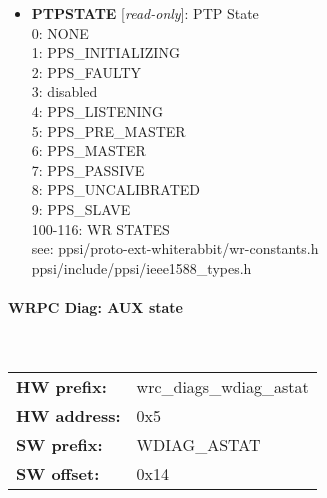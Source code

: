 \begin{itemize}
\item \begin{small}
{\bf 
PTPSTATE
} [\emph{read-only}]: PTP State
\\
0: NONE\\                     1: PPS\_INITIALIZING\\                     2: PPS\_FAULTY\\                     3: disabled\\                     4: PPS\_LISTENING\\                     5: PPS\_PRE\_MASTER\\                     6: PPS\_MASTER\\                     7: PPS\_PASSIVE\\                     8: PPS\_UNCALIBRATED\\                     9: PPS\_SLAVE\\                     100-116: WR STATES\\                     see: ppsi/proto-ext-whiterabbit/wr-constants.h\\                          ppsi/include/ppsi/ieee1588\_types.h
\end{small}
\end{itemize}
\paragraph*{WRPC Diag: AUX state}\mbox{}\\\vskip 6pt
\begin{tabular}{l l }
{\bf HW prefix:}  & wrc\_diags\_wdiag\_astat\\
{\bf HW address:}  & 0x5\\
{\bf SW prefix:}  & WDIAG\_ASTAT\\
{\bf SW offset:}  & 0x14\\
\end{tabular}


